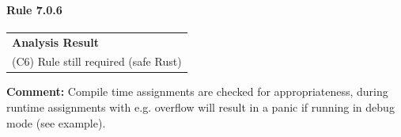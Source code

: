 \paragraph{Rule 7.0.6}
\begin{longtable}{p{13cm}}
\textbf{Analysis Result} \\
(C6) Rule still required (safe Rust) \\
\end{longtable}
\textbf{Comment:} Compile time assignments are checked for appropriateness, during runtime assignments with e.g. overflow will result in a panic if running in debug mode (see example). \\



